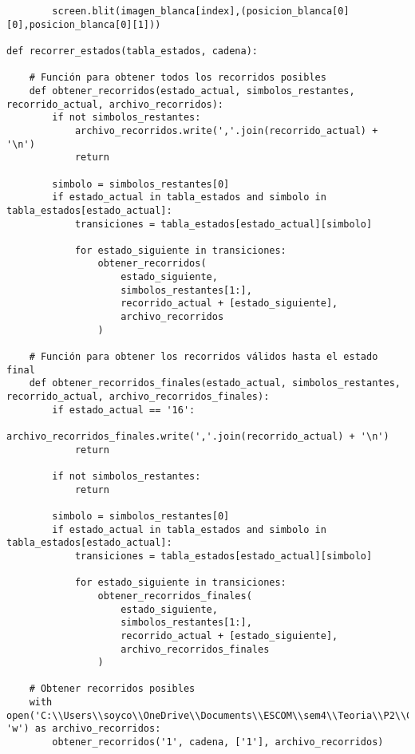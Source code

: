 \begin{lstlisting}
        screen.blit(imagen_blanca[index],(posicion_blanca[0][0],posicion_blanca[0][1]))
  
def recorrer_estados(tabla_estados, cadena):
    
    # Función para obtener todos los recorridos posibles
    def obtener_recorridos(estado_actual, simbolos_restantes, recorrido_actual, archivo_recorridos):
        if not simbolos_restantes:
            archivo_recorridos.write(','.join(recorrido_actual) + '\n')
            return

        simbolo = simbolos_restantes[0]
        if estado_actual in tabla_estados and simbolo in tabla_estados[estado_actual]:
            transiciones = tabla_estados[estado_actual][simbolo]

            for estado_siguiente in transiciones:
                obtener_recorridos(
                    estado_siguiente,
                    simbolos_restantes[1:],
                    recorrido_actual + [estado_siguiente],
                    archivo_recorridos
                )

    # Función para obtener los recorridos válidos hasta el estado final
    def obtener_recorridos_finales(estado_actual, simbolos_restantes, recorrido_actual, archivo_recorridos_finales):
        if estado_actual == '16':
            archivo_recorridos_finales.write(','.join(recorrido_actual) + '\n')
            return

        if not simbolos_restantes:
            return

        simbolo = simbolos_restantes[0]
        if estado_actual in tabla_estados and simbolo in tabla_estados[estado_actual]:
            transiciones = tabla_estados[estado_actual][simbolo]

            for estado_siguiente in transiciones:
                obtener_recorridos_finales(
                    estado_siguiente,
                    simbolos_restantes[1:],
                    recorrido_actual + [estado_siguiente],
                    archivo_recorridos_finales
                )

    # Obtener recorridos posibles
    with open('C:\\Users\\soyco\\OneDrive\\Documents\\ESCOM\\sem4\\Teoria\\P2\\Chess\\output\\recorridos_blanca.txt', 'w') as archivo_recorridos:
        obtener_recorridos('1', cadena, ['1'], archivo_recorridos)


\end{lstlisting}
